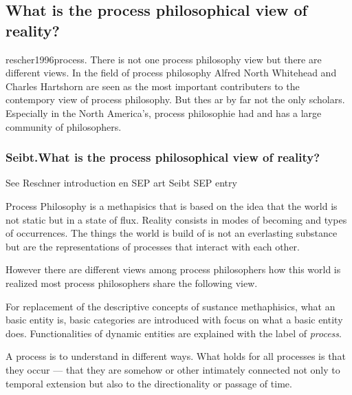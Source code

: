 
\subsection{What is the process philosophical view of reality?}
{rescher1996process}.
There is not one process philosophy view but there are 
different views.
In the field of process philosophy Alfred North Whitehead and 
Charles Hartshorn are seen as the most important contributers 
to the contempory view of process philosophy. 
But thes ar by far not the only scholars. Especially in the 
North America's, process philosophie had and has a large 
community of philosophers. 
\cite{rescher1996process}

\subsubsection{Seibt.What is the process philosophical view of reality?}


See Reschner introduction en SEP art \cite{Rescher-2012-sep}
Seibt SEP entry \cite{Seibt-2013-sep}

Process Philosophy is a methapisics that is based on the idea that the world is not static but in a state of flux. Reality consists in modes of becoming and types of occurrences. 
The things the world is build of is not an everlasting substance but are the representations of processes that interact with each other.  

However there are different views among process philosophers how this world is realized  most process philosophers share the following view.

For replacement of the descriptive concepts of sustance methaphisics, what an basic entity is, basic categories are introduced with focus on what a basic entity does.
Functionalities of dynamic entities are explained with the label of \textit{process}. 

A process is to understand in different ways. 
What holds for all processes is that they occur — that they are somehow or other intimately connected not only to temporal extension but also to the directionality or passage of time.

